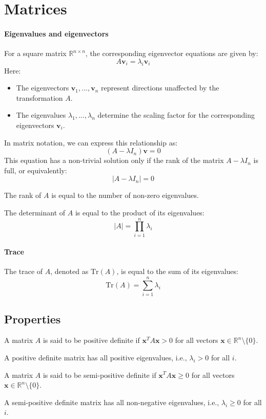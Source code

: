 \section{Matrices}

\paragraph*{Eigenvalues and eigenvectors}
For a square matrix $\mathbb{R}^{n \times n}$,  the corresponding eigenvector equations are given by:
\[A\textbf{v}_i=\lambda_i\textbf{v}_i\]
Here:
\begin{itemize}
    \item The eigenvectors $\textbf{v}_1,\dots,\textbf{v}_n$ represent directions unaffected by the transformation $A$. 
    \item The eigenvalues $\lambda_1,\dots,\lambda_n$ determine the scaling factor for the corresponding eigenvectors $\textbf{v}_i$. 
\end{itemize}
In matrix notation, we can express this relationship as:
\[(A-\lambda I_n)\textbf{v}=0\]
This equation has a non-trivial solution only if the rank of the matrix $A-\lambda I_n$ is full, or equivalently:
\[\left\lvert A-\lambda I_n \right\rvert=0\]
\begin{property}
    The rank of $A$ is equal to the number of non-zero eigenvalues. 
\end{property}   
\begin{property}
    The determinant of $A$ is equal to the product of its eigenvalues: 
    \[\left\lvert A \right\rvert=\prod_{i=1}^{n} \lambda_i\]
\end{property}   

\paragraph*{Trace}
The trace of $A$, denoted as $\text{Tr}(A)$, is equal to the sum of its eigenvalues: 
\[\text{Tr}(A)=\sum_{i=1}^{n}\lambda_i\]

\subsection{Properties}
\begin{definition}
    A matrix $A$ is said to be positive definite if $\textbf{x}^T A \textbf{x}>0$ for all vectors $\textbf{x} \in \mathbb{R}^n\setminus\{0\}$. 
\end{definition}
A positive definite matrix has all positive eigenvalues, i.e., $\lambda_i>0$ for all $i$. 
\begin{definition}
    A matrix $A$  is said to be semi-positive definite if $\textbf{x}^T A \textbf{x}\geq 0$ for all vectors $\textbf{x} \in \mathbb{R}^n\setminus\{0\}$. 
\end{definition}
A semi-positive definite matrix has all non-negative eigenvalues, i.e., $\lambda_i \geq 0$ for all $i$. 